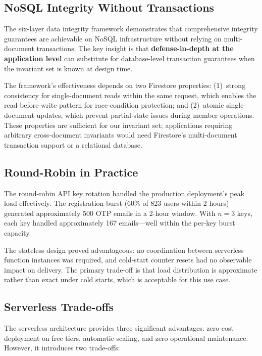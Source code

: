 \documentclass[11pt,a4paper]{article}
\theoremstyle{plain}
\theoremstyle{definition}
\begin{document}
\subsection{NoSQL Integrity Without Transactions}

The six-layer data integrity framework demonstrates that comprehensive integrity guarantees are achievable on NoSQL infrastructure without relying on multi-document transactions. The key insight is that \textbf{defense-in-depth at the application level} can substitute for database-level transaction guarantees when the invariant set is known at design time.

The framework's effectiveness depends on two Firestore properties: (1)~strong consistency for single-document reads within the same request, which enables the read-before-write pattern for race-condition protection; and (2)~atomic single-document updates, which prevent partial-state issues during member operations. These properties are sufficient for our invariant set; applications requiring arbitrary cross-document invariants would need Firestore's multi-document transaction support or a relational database.

\subsection{Round-Robin in Practice}

The round-robin API key rotation handled the production deployment's peak load effectively. The registration burst (60\% of 823 users within 2 hours) generated approximately 500 OTP emails in a 2-hour window. With $n = 3$ keys, each key handled approximately 167 emails---well within the per-key burst capacity.

The stateless design proved advantageous: no coordination between serverless function instances was required, and cold-start counter resets had no observable impact on delivery. The primary trade-off is that load distribution is approximate rather than exact under cold starts, which is acceptable for this use case.

\subsection{Serverless Trade-offs}

The serverless architecture provides three significant advantages: zero-cost deployment on free tiers, automatic scaling, and zero operational maintenance. However, it introduces two trade-offs:
\end{document}
